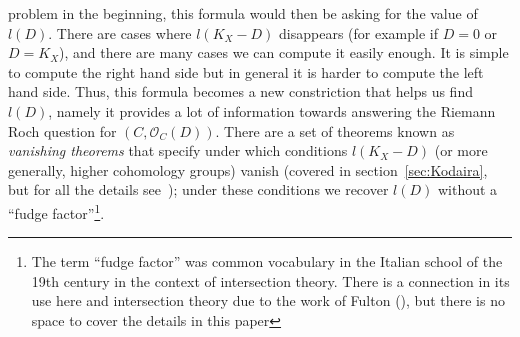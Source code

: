 \documentclass{book}
\newcommand{\CO}{{\mathcal{O}}}
\begin{document}
problem in the beginning, this formula would then be asking for the value of $l(D)$. There are cases where
$l(K_X-D)$ disappears (for example if $D = 0$ or $D = K_X$), and there are many cases we can compute it easily
enough. It is simple to compute the right hand side but in general it is harder to compute the left hand
side. Thus, this formula becomes a new constriction that helps us find $l(D)$, namely it provides a lot of
information towards answering the Riemann Roch question for $(C, \CO_C(D))$. There are a set of theorems known
as \emph{vanishing theorems} that specify under which conditions $l(K_X-D)$ (or more generally, higher
cohomology groups) vanish (covered in section~\ref{sec:Kodaira}, but for all the details
see~\cite{deligneRelevementsModulop2etDecomposition1987}); under these conditions we recover $l(D)$ without a
``fudge factor''\footnote{The term ``fudge factor'' was common vocabulary in the Italian school of the 19th
century in the context of intersection theory. There is a connection in its use here and intersection theory
due to the work of Fulton (\cite{fultonIntersectionTheory1984}), but there is no space to cover the details
in this paper}.
\end{document}

